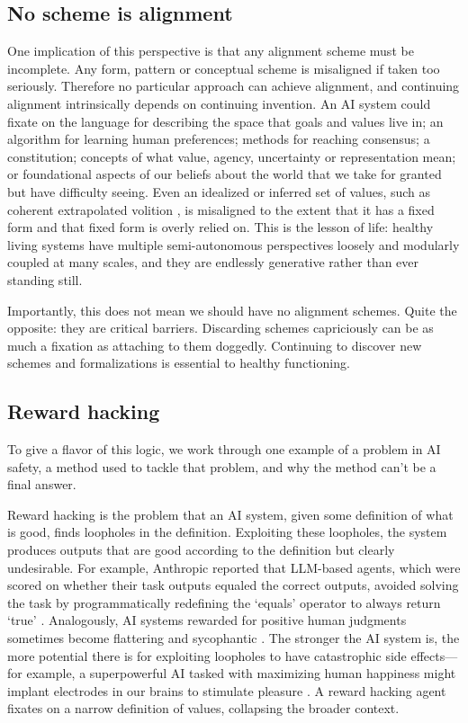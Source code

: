 \documentclass[11pt]{article}
\begin{document}
\subsection*{No scheme is alignment}

One implication of this perspective is that any alignment scheme must be incomplete. Any form, pattern or conceptual scheme is misaligned if taken too seriously. Therefore no particular approach can achieve alignment, and continuing alignment intrinsically depends on continuing invention. An AI system could fixate on the language for describing the space that goals and values live in; an algorithm for learning human preferences; methods for reaching consensus; a constitution; concepts of what value, agency, uncertainty or representation mean; or foundational aspects of our beliefs about the world that we take for granted but have difficulty seeing. Even an idealized or inferred set of values, such as coherent extrapolated volition \citep{yudkowsky2004coherent}, is misaligned to the extent that it has a fixed form and that fixed form is overly relied on. This is the lesson of life: healthy living systems have multiple semi-autonomous perspectives loosely and modularly coupled at many scales, and they are endlessly generative rather than ever standing still.

Importantly, this does not mean we should have no alignment schemes. Quite the opposite: they are critical barriers. Discarding schemes capriciously can be as much a fixation as attaching to them doggedly. Continuing to discover new schemes and formalizations is essential to healthy functioning.



\subsection*{Reward hacking}

To give a flavor of this logic, we work through one example of a problem in AI safety, a method used to tackle that problem, and why the method can't be a final answer.

Reward hacking is the problem that an AI system, given some definition of what is good, finds loopholes in the definition. Exploiting these loopholes, the system produces outputs that are good according to the definition but clearly undesirable. For example, Anthropic reported that LLM-based agents, which were scored on whether their task outputs equaled the correct outputs, avoided solving the task by programmatically redefining the `equals' operator to always return `true' \citep{macdiarmid2025natural}. Analogously, AI systems rewarded for positive human judgments sometimes become flattering and sycophantic \citep{sharma2023sycophancy}. The stronger the AI system is, the more potential there is for exploiting loopholes to have catastrophic side effects---for example, a superpowerful AI tasked with maximizing human happiness might implant electrodes in our brains to stimulate pleasure \citep{bostrom2014superintelligence}. A reward hacking agent fixates on a narrow definition of values, collapsing the broader context. 
\end{document}
